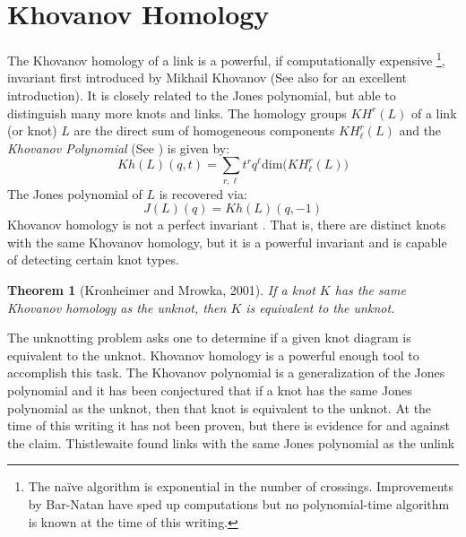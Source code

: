 \documentclass{article}
\theoremstyle{plain}
\newtheorem{theorem}{Theorem}
\begin{document}
    \section{Khovanov Homology}
        The Khovanov homology of a link is a powerful, if computationally
        expensive%
        \footnote{%
            The na\"{i}ve algorithm is exponential in the number of
            crossings. Improvements by Bar-Natan \cite{BarNatanFastKhoHo}
            have sped up computations but no polynomial-time algorithm is
            known at the time of this writing.
        },
        invariant first introduced by Mikhail Khovanov
        \cite{Khovanov1999CatJonesPoly} (See also \cite{barnatan2002khovanov}
        for an excellent introduction). It is closely related to the Jones
        polynomial, but able to distinguish many more knots and links. The
        homology groups $KH^{r}(L)$ of a link (or knot) $L$ are the direct sum
        of homogeneous components $KH_{\ell}^{r}(L)$ and the
        \textit{Khovanov Polynomial} (See \cite{KatlasKhoHo}) is given by:
        \begin{equation}
            Kh(L)(q,t)=
            \sum_{r,\ell}t^{r}q^{\ell}\textrm{dim}\big(KH_{\ell}^{r}(L)\big)
        \end{equation}
        The Jones polynomial of $L$ is recovered via:
        \begin{equation}
            J(L)(q)=Kh(L)(q,-1)
        \end{equation}
        Khovanov homology is not a perfect invariant
        \cite{Watson2007KnotsWI}. That is, there are
        distinct knots with the same Khovanov homology, but it is a powerful
        invariant and is capable of detecting certain knot types.
        \begin{theorem}[Kronheimer and Mrowka, 2001]
            If a knot $K$ has the same Khovanov homology as the unknot, then $K$
            is equivalent to the unknot.
        \end{theorem}
        The unknotting problem asks one to determine if a given knot diagram is
        equivalent to the unknot. Khovanov homology is a powerful enough tool
        to accomplish this task. The Khovanov polynomial is a generalization of
        the Jones polynomial and it has been conjectured that if a
        knot has the same Jones polynomial as the unknot, then that knot is
        equivalent to the unknot. At the time of this writing it has not been
        proven, but there is evidence for and against the claim.
        Thistlewaite found links with the same Jones polynomial as the unlink
\end{document}
